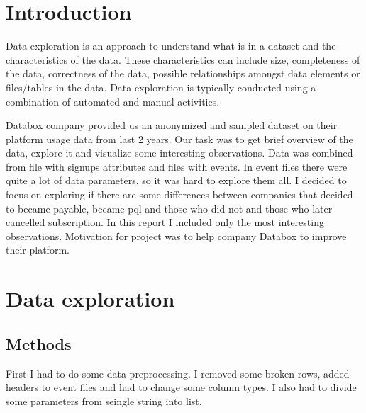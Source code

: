 \documentclass[fleqn,moreauthors,10pt]{ds_report}
\affiliation{\textsuperscript{1}\textit{vz9592@student.uni-lj.si, 63210496}}
\begin{document}
\flushbottom

\maketitle

\thispagestyle{empty}


\section*{Introduction}

    Data exploration is an approach to understand what is in a dataset and the characteristics of the data. These characteristics can include size, completeness of the data, correctness of the data, possible relationships amongst data elements or files/tables in the data. Data exploration is typically conducted using a combination of automated and manual activities.

	Databox company provided us an anonymized and sampled dataset on their platform usage data from last 2 years. Our task was to get brief overview of the data, explore it and visualize some interesting observations. Data was combined from file with signups attributes and files with events. In event files there were quite a lot of data parameters, so it was hard to explore them all.  I decided to focus on exploring if there are some differences between companies that decided to became payable, became pql and those who did not and those who later cancelled subscription. In this report I included only the most interesting observations. Motivation for project was to help company Databox to improve their platform.
	
	



\section*{Data exploration}
\subsection{Methods}
First I had to do some data preprocessing. I removed some broken rows, added headers to event files and had to change some column types. I also had to divide some parameters from seingle string into list.
\end{document}
